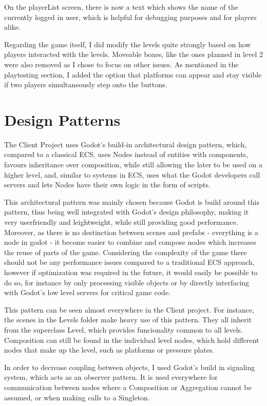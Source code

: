 \documentclass{article}
\begin{document}
\bigskip
On the playerList screen, there is now a text which shows the name of the currently logged in user, which is helpful for debugging purposes and for players alike.

\bigskip
Regarding the game itself, I did modify the levels quite strongly based on how players interacted with the levels. Moveable boxes, like the ones planned in level 2 were also removed as I chose to focus on other issues. As mentioned in the playtesting section, I added the option that platforms can appear and stay visible if two players simultaneously step onto the buttons. 

\section{Design Patterns}
The Client Project uses Godot's build-in architectural design pattern, which, compared to a classical ECS, uses Nodes instead of entities with components, favours inheritance over composition, while still allowing the later to be used on a higher level, and, similar to systems in ECS, uses what the Godot developers call servers and lets Nodes have their own logic in the form of scripts. 

This architectural pattern was mainly chosen because Godot is build around this pattern, thus being well integrated with Godot's design philosophy, making it very userfriendly and leightweight, while still providing good performance. Moreover, as there is no destinction between scenes and prefabs - everything is a node in godot - it become easier to combine and compose nodes which increases the reuse of parts of the game. Considering the complexity of the game there should not be any performance issues compared to a traditional ECS approach, however if optimization was required in the future, it would easily be possible to do so, for instance  by only processing visible objects or by directly interfacing with Godot's low level servers for critical game code. 

This pattern can be seen almost everywhere in the Client project. For instance, the scenes in the Levels folder make heavy use of this pattern. They all inherit from the superclass Level, which provides funcionality common to all levels. Composition can still be found in the individual level nodes, which hold different nodes that make up the level, such as platforms or pressure plates.

\bigskip
In order to decrease coupling between objects, I used Godot's build in signaling system, which acts as an observer pattern. It is used everywhere for communication between nodes where a Composition or Aggregation cannot be assumed, or when making calls to a Singleton. 
\end{document}
